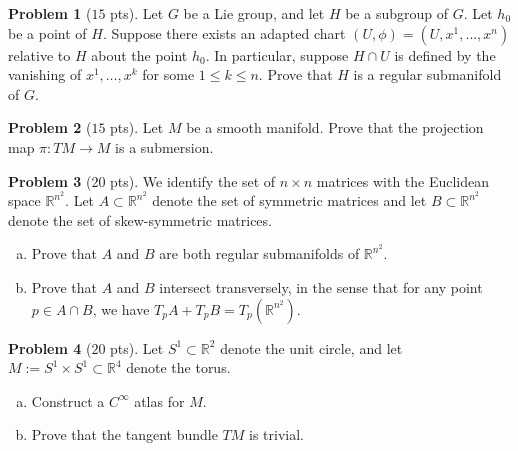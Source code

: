 \documentclass{amsart}
\newcommand{\+}[1]{\ensuremath{\mathbf{#1}}}
\newcommand{\R}{{\mathbb R}}
\theoremstyle{definition}
\newtheorem{prob}{Problem}
\begin{document}
\vspace{3mm}

\begin{prob}[$15$ pts]
Let $G$ be a Lie group, and let $H$ be a subgroup of $G$.  Let $h_0$ be a point of $H$.
Suppose there exists an adapted chart $(U, \phi) = (U, x^1, \ldots, x^n)$ relative to $H$ about the point $h_0$.
In particular, suppose $H \cap U$ is defined by the vanishing of $x^1, \ldots, x^k$ for some
$1 \leq k \leq n$.  Prove that $H$ is a regular submanifold of $G$.
\end{prob}


\vspace{3mm}




\begin{prob}[$15$ pts]
 Let $M$ be a smooth manifold.  Prove that the projection map $\pi: TM \to M$ is a submersion.
\end{prob}

\vspace{3mm}

\begin{prob}[$20$ pts]
We identify the set of $n \times n$ matrices with the Euclidean space $\R^{n^2}$.
Let $A \subset \R^{n^2}$ denote the set of symmetric matrices and let $B \subset \R^{n^2}$ denote the set of skew-symmetric matrices.
 \begin{enumerate}[(a)]
  \item  Prove that $A$ and $B$ are both regular submanifolds of $\R^{n^2}$.
  \item  Prove that $A$ and $B$ intersect transversely, in the sense that for any point $p \in A \cap B$,
  we have $T_pA + T_pB = T_p (\R^{n^2})$.
 \end{enumerate}
\end{prob}

\vspace{3mm}

\begin{prob}[$20$ pts]
 Let $S^1 \subset \R^2$ denote the unit circle, and let  $M := S^1 \times S^1 \subset \R^4$
 denote the torus.
 \begin{enumerate}[(a)]
  \item Construct a $C^{\infty}$ atlas for $M$. 
  \item Prove that the tangent bundle $TM$ is trivial.
 \end{enumerate}

\end{prob}
\end{document}
